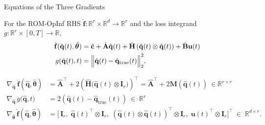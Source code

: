 \begin{frame}{Equations of the Three Gradients}

For the \textcolor{codeblue}{ROM-OpInf RHS} $\hat{\mathbf{f}}:\mathbb{R}^r \times \mathbb{R}^d \to \mathbb{R}^r$ and the \textcolor{codeblue}{loss integrand} $g:\mathbb{R}^r\times [0,T]\to \mathbb{R}$,
\begin{align*}
    \hat{\mathbf{f}}(\hat{\mathbf{q}}(t),\hat{\bm{\theta}}) &= \hat{\mathbf{c}} + \hat{\mathbf{A}}\hat{\mathbf{q}}(t) + \hat{\mathbf{H}}\left( \hat{\mathbf{q}}(t)\otimes\hat{\mathbf{q}}(t) \right) + \hat{\mathbf{B}}\mathbf{u}(t) \\
    g(\hat{\mathbf{q}}(t),t) &= \Bigl\|\hat{\mathbf{q}}(t) - \hat{\mathbf{q}}_{\mathrm{true}}(t)\Bigr\|_2^2,
\end{align*}


\begin{tcolorbox}[height=3.6cm, colback=gray!10, colframe=gray!50, boxrule=0.5pt, arc=2pt]
\begin{align*}
    \nabla_{\hat{\mathbf{q}}}~\hat{\mathbf{f}}(\hat{\mathbf{q}}, \hat{\bm{\theta}}) &= \hat{\mathbf{A}}^{\top} + 2\left( \hat{\mathbf{H}}\bigl( \hat{\mathbf{q}}(t) \otimes \mathbf{I}_r \bigr) \right)^{\top} = \hat{\mathbf{A}}^{\top} + 2\mathbf{M}(\hat{\mathbf{q}}(t)) ~ \in \mathbb{R}^{r \times r} \\
    \nabla_{\hat{\mathbf{q}}}\,g\bigl(\hat{\mathbf{q}},t\bigr) &= 2\left(\hat{\mathbf{q}}(t) - \hat{\mathbf{q}}_{\mathrm{true}}(t)\right)~\in\;\mathbb{R}^{r} \\
\nabla_{\hat{\bm{\theta}}}\,\hat{\mathbf{f}}(\hat{\mathbf{q}}, \hat{\bm{\theta}}) &= \bigl[\,\mathbf{I}_r,\;\hat{\mathbf{q}}(t)^{\top}\otimes\mathbf{I}_r,\;(\hat{\mathbf{q}}(t)\otimes\hat{\mathbf{q}}(t))^{\top}\otimes\mathbf{I}_r,\;\mathbf{u}(t)^{\top}\otimes\mathbf{I}_r\bigr]^{\top}~\in\;\mathbb{R}^{d\times r}.
\end{align*}
\end{tcolorbox}

\end{frame}


